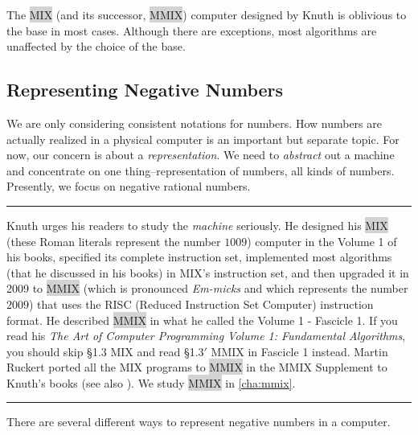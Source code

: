 The \colorbox{lightgray}{MIX} (and its successor, \colorbox{lightgray}{MMIX}) computer designed by Knuth is oblivious to the base in most cases. Although there are exceptions, most algorithms are unaffected by the choice of the base. 

\subsection*{Representing Negative Numbers}
We are only considering consistent notations for numbers. How numbers are actually realized in a physical computer is an important but separate topic. For now, our concern is about a \textit{representation}. We need to \textit{abstract} out a machine and concentrate on one thing--representation of numbers, all kinds of numbers. Presently, we focus on negative rational numbers. 

\vspace{5pt}
\hrule
\vspace{5pt}

Knuth urges his readers to study the \textit{machine} seriously. He designed his \colorbox{lightgray}{MIX} (these Roman literals represent the number $1009$) computer in the Volume 1 of his books, specified its complete instruction set, implemented most algorithms (that he discussed in his books) in MIX's instruction set, and then upgraded it in 2009 to \colorbox{lightgray}{MMIX} (which is pronounced \textit{Em-micks} and which represents the number $2009$) that uses the RISC (Reduced Instruction Set Computer) instruction format. He described \colorbox{lightgray}{MMIX} in what he called the Volume 1 - Fascicle 1. If you read his \textit{The Art of Computer Programming Volume 1: Fundamental Algorithms}, you should skip \S 1.3 MIX and read \S 1.3$'$ MMIX in Fascicle 1 instead. Martin Ruckert ported all the MIX programs to \colorbox{lightgray}{MMIX} in the MMIX Supplement to Knuth's books (see also \cite{mmix}). We study \colorbox{lightgray}{MMIX} in \ref{cha:mmix}. 

\vspace{5pt}
\hrule
\vspace{5pt}

There are several different ways to represent negative numbers in a computer.


